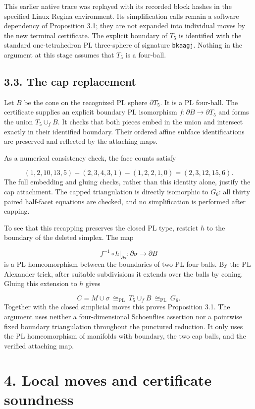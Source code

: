\documentclass[11pt,letterpaper]{article}
\begin{document}
This earlier native trace was replayed with its recorded block hashes in the specified Linux Regina environment. Its simplification calls remain a software dependency of Proposition 3.1; they are not expanded into individual moves by the new terminal certificate. The explicit boundary of $T_5$ is identified with the standard one-tetrahedron PL three-sphere of signature {\small\texttt{bkaagj}}. Nothing in the argument at this stage assumes that $T_5$ is a four-ball.

\subsection*{3.3. The cap replacement}
Let $B$ be the cone on the recognized PL sphere $\partial T_5$. It is a PL four-ball. The certificate supplies an explicit boundary PL isomorphism $f:\partial B\longrightarrow\partial T_5$ and forms the union $T_5\cup_f B$. It checks that both pieces embed in the union and intersect exactly in their identified boundary. Their ordered affine subface identifications are preserved and reflected by the attaching maps.

As a numerical consistency check, the face counts satisfy

\[
(1,2,10,13,5)+(2,3,4,3,1)-(1,2,2,1,0)=(2,3,12,15,6).
\]
The full embedding and gluing checks, rather than this identity alone, justify the cap attachment. The capped triangulation is directly isomorphic to $G_6$: all thirty paired half-facet equations are checked, and no simplification is performed after capping.

To see that this recapping preserves the closed PL type, restrict $h$ to the boundary of the deleted simplex. The map

\[
f^{-1}\circ h|_{\partial\sigma}:\partial\sigma\longrightarrow\partial B
\]
is a PL homeomorphism between the boundaries of two PL four-balls. By the PL Alexander trick, after suitable subdivisions it extends over the balls by coning. Gluing this extension to $h$ gives

\[
C=M\cup\sigma\ \cong_{\mathrm{PL}}\ T_5\cup_f B\ \cong_{\mathrm{PL}}\ G_6.
\]
Together with the closed simplicial moves this proves Proposition 3.1. The argument uses neither a four-dimensional Schoenflies assertion nor a pointwise fixed boundary triangulation throughout the punctured reduction. It only uses the PL homeomorphism of manifolds with boundary, the two cap balls, and the verified attaching map.

\section*{4. Local moves and certificate soundness}
\end{document}
